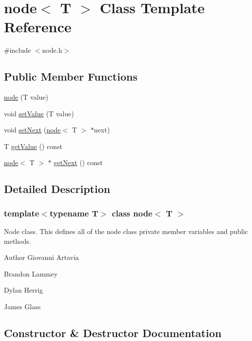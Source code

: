 \hypertarget{classnode}{}\section{node$<$ T $>$ Class Template Reference}
\label{classnode}


{\ttfamily \#include $<$node.\+h$>$}

\subsection*{Public Member Functions}
\begin{DoxyCompactItemize}
\item 
\hyperlink{classnode_a8b84a889cdb6da341c5c930ec13ed7ff}{node} (T value)
\item 
void \hyperlink{classnode_aa2f5fc0ca069085519055c6efd385144}{set\+Value} (T value)
\item 
void \hyperlink{classnode_abfa39769660ee5f0ce6918f0ec6d4a4a}{set\+Next} (\hyperlink{classnode}{node}$<$ T $>$ $\ast$next)
\item 
T \hyperlink{classnode_a48d5a4f57ab731018e412f5dbf0d95bc}{get\+Value} () const
\item 
\hyperlink{classnode}{node}$<$ T $>$ $\ast$ \hyperlink{classnode_a8faca1f11583f5b1e951c846c3b5c78f}{get\+Next} () const
\end{DoxyCompactItemize}


\subsection{Detailed Description}
\subsubsection*{template$<$typename T$>$\newline
class node$<$ T $>$}

Node class. This defines all of the node class\textquotesingle{} private member variables and public methods. \begin{DoxyAuthor}{Author}
Giovanni Artavia 

Brandon Lammey 

Dylan Herrig 

James Glass 
\end{DoxyAuthor}


\subsection{Constructor \& Destructor Documentation}
\mbox{\label{classnode_a8b84a889cdb6da341c5c930ec13ed7ff}} 
